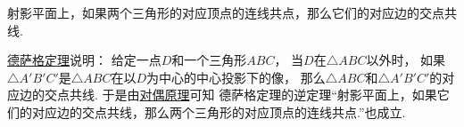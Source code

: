 \begin{theorem}[德萨格定理]\label{theorem:解析几何.射影平面上的对偶原理.德萨格定理}
射影平面上，如果两个三角形的对应顶点的连线共点，那么它们的对应边的交点共线.
\end{theorem}

\hyperref[theorem:解析几何.射影平面上的对偶原理.德萨格定理]{德萨格定理}说明：
给定一点\(D\)和一个三角形\(ABC\)，
当\(D\)在\(\triangle ABC\)以外时，
如果\(\triangle A'B'C'\)是\(\triangle ABC\)在以\(D\)为中心的中心投影下的像，
那么\(\triangle ABC\)和\(\triangle A'B'C'\)的对应边的交点共线.
于是由\hyperref[theorem:解析几何.射影平面上的对偶原理.对偶原理]{对偶原理}可知
德萨格定理的逆定理“射影平面上，如果它们的对应边的交点共线，那么两个三角形的对应顶点的连线共点.”也成立.
